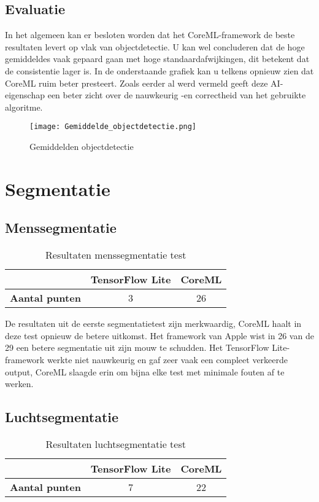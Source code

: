 \subsection{Evaluatie}
In het algemeen kan er besloten worden dat het CoreML-framework de beste  resultaten levert op vlak van objectdetectie. U kan wel concluderen dat de hoge gemiddeldes vaak gepaard gaan met hoge standaardafwijkingen, dit betekent dat de consistentie lager is. In de onderstaande grafiek kan u telkens opnieuw zien dat CoreML ruim beter presteert. Zoals eerder al werd vermeld geeft deze AI-eigenschap een beter zicht over de nauwkeurig -en correctheid van het gebruikte algoritme.
\begin{figure}[H]
	\centering
	\texttt{[image: Gemiddelde\_objectdetectie.png]}
	\caption{Gemiddelden objectdetectie}
\end{figure}

\section{Segmentatie}
\subsection{Menssegmentatie}
\begin{table}[H]
	\centering
	\begin{tabular}{|c|c|c|}
		\hline
		& \textbf{TensorFlow Lite} & \textbf{CoreML} \\ \hline
		\textbf{Aantal punten} & 3                        & 26              \\ \hline
	\end{tabular}
	\caption{Resultaten menssegmentatie test}
\end{table}

De resultaten uit de eerste segmentatietest zijn merkwaardig, CoreML haalt in deze test opnieuw de betere uitkomst. Het framework van Apple wist in 26 van de 29 een betere segmentatie uit zijn mouw te schudden. Het TensorFlow Lite-framework werkte niet nauwkeurig en gaf zeer vaak een compleet verkeerde output, CoreML slaagde erin om bijna elke test met minimale fouten af te werken.

\subsection{Luchtsegmentatie}
\begin{table}[H]
	\centering
	\begin{tabular}{|c|c|c|}
		\hline
		& \textbf{TensorFlow Lite} & \textbf{CoreML} \\ \hline
		\textbf{Aantal punten} & 7                        & 22              \\ \hline
	\end{tabular}
	\caption{Resultaten luchtsegmentatie test}
\end{table}

